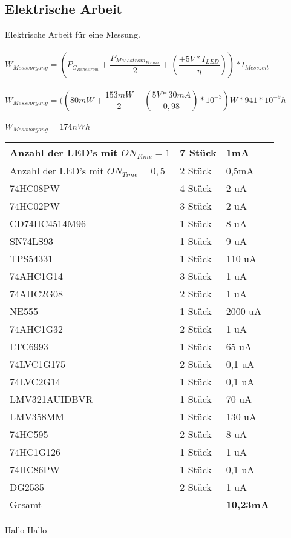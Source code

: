\subsection{Elektrische Arbeit}

Elektrische Arbeit für eine Messung.
\\
\\
$W_{Messvorgang} = (P_{G_{Ruhestrom}} + \dfrac{P_{Messstrom_{Primär}}}{2} + (\dfrac{+5V * I_{LED}}{\eta})) * t_{Messzeit}$
\\
\\
$W_{Messvorgang} = ((80mW + \dfrac{153mW}{2} + (\dfrac{5V * 30mA}{0,98})*10^{-3})W * 941 * 10^{-9}h$
\\
\\
$W_{Messvorgang} = 174nWh$

\newpage
\renewcommand{\arraystretch}{2}
\begin{tabularx}{\textwidth}{p{}| p{} | p{}}
Anzahl der LED's mit  $ON_{Time} = 1$			&	7 Stück		&	1mA 		\\
\hline
Anzahl der LED's mit  $ON_{Time} = 0,5	$	&	2 Stück		&	0,5mA 		\\
\hline
74HC08PW								&	4 Stück		&	2 uA		\\
\hline
74HC02PW								&	3 Stück		&	2 uA		\\
\hline
CD74HC4514M96							&	1 Stück		&	8 uA		\\
\hline
SN74LS93								&	1 Stück		&	9 uA		\\
\hline
TPS54331								&	1 Stück		&	110 uA		\\
\hline
74AHC1G14								&	3 Stück		&	1 uA		\\
\hline
74AHC2G08								&	2 Stück		&	1 uA		\\
\hline
NE555									&	1 Stück		&	2000 uA		\\
\hline
74AHC1G32								&	2 Stück		&	1 uA		\\
\hline
LTC6993									&	1 Stück		&	65 uA		\\
\hline
74LVC1G175								&	2 Stück		&	0,1 uA		\\
\hline
74LVC2G14								&	1 Stück		&	0,1 uA		\\
\hline
LMV321AUIDBVR							&	1 Stück		&	70 uA		\\
\hline
LMV358MM								&	1 Stück		&	130 uA		\\
\hline
74HC595									&	2 Stück		&	8 uA		\\
\hline
74HC1G126								&	1 Stück		&	1 uA		\\
\hline
74HC86PW								&	1 Stück		&	0,1 uA		\\
\hline
DG2535									&	2 Stück		&	1 uA		\\
\hline 
Gesamt									&				&	\textbf{10,23mA} \\
\end{tabularx}
\renewcommand{\arraystretch}{1}

Hallo Hallo
